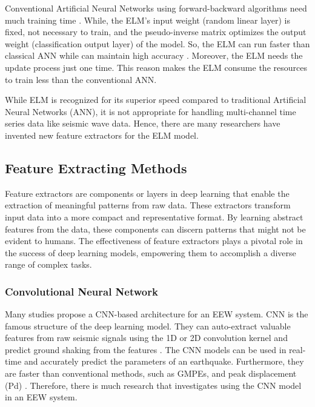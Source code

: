 Conventional Artificial Neural Networks using forward-backward algorithms need much training time \cite{lian2013displacement}.  While, the ELM's input weight (random linear layer) is fixed, not necessary to train, and the pseudo-inverse matrix optimizes the output weight (classification output layer) of the model. So, the ELM can run faster than classical ANN while can maintain high accuracy \cite{asim2017earthquake, salam2021earthquake}. Moreover, the ELM needs the update process just one time. This reason makes the ELM consume the resources to train less than the conventional ANN.

While ELM is recognized for its superior speed compared to traditional Artificial Neural Networks (ANN), it is not appropriate for handling multi-channel time series data like seismic wave data. Hence, there are many researchers have invented new feature extractors for the ELM model.

\subsection{Feature Extracting Methods}
\label{subsec:featureExtract}
Feature extractors are components or layers in deep learning that enable the extraction of meaningful patterns from raw data. These extractors transform input data into a more compact and representative format. By learning abstract features from the data, these components can discern patterns that might not be evident to humans. The effectiveness of feature extractors plays a pivotal role in the success of deep learning models, empowering them to accomplish a diverse range of complex tasks.

\subsubsection{Convolutional  Neural Network}
Many studies \cite{chiang2022neural, jozinovic2020rapid, li2018machine, mousavi2020machine, perol2018convolutional} propose a CNN-based architecture for an EEW system. CNN is the famous structure of the deep learning model. They can auto-extract valuable features from raw seismic signals using the 1D or 2D convolution kernel and predict ground shaking from the features \cite{chiang2022neural, jozinovic2020rapid, li2018machine, mousavi2020machine, mousavi2020machine}. The CNN models can be used in real-time and accurately predict the parameters of an earthquake. Furthermore, they are faster than conventional methods, such as GMPEs, and peak displacement (Pd) \cite{chiang2022neural, jozinovic2020rapid}. Therefore, there is much research that investigates using the CNN model in an EEW system.

